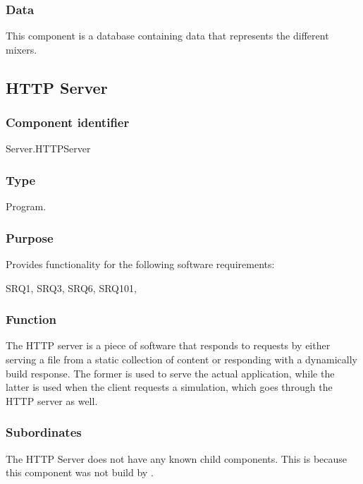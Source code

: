 \subsubsection*{Data}
This component is a database containing data that represents the different mixers.

\subsection{HTTP Server}
\label{subsec:httpserver}

\subsubsection*{Component identifier}
Server.HTTPServer

\subsubsection*{Type}
Program.

\subsubsection*{Purpose}
Provides functionality for the following software requirements:

\noindent SRQ1, SRQ3, SRQ6, SRQ101,

\subsubsection*{Function}
The HTTP server is a piece of software that responds to requests by either serving a file from a static collection of content or responding with a dynamically build response. The former is used to serve the actual application, while the latter is used when the client requests a simulation, which goes through the HTTP server as well.

\subsubsection*{Subordinates}
The HTTP Server does not have any known child components. This is because this component was not build by \projectauthor.

